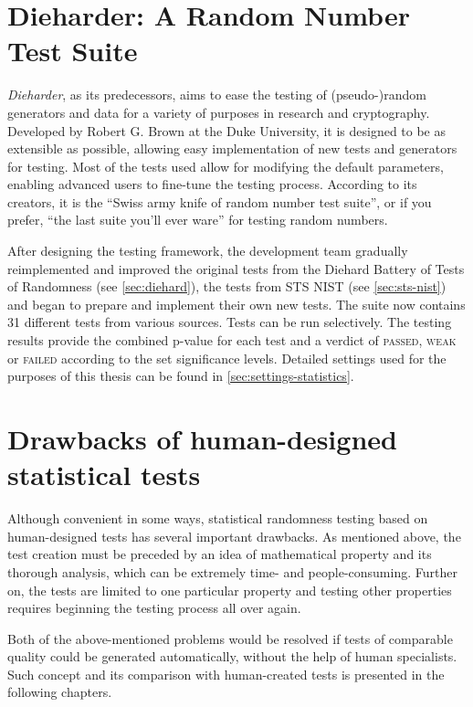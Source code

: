 \documentclass[12pt,twoside]{fithesis2}		%
\renewcommand{\_}{\leavevmode \kern0.0em\vbox{\hrule width0.4em}}
\begin{document}
\section{Dieharder: A Random Number Test Suite}
\label{sec:dieharder}

\textit{Dieharder}, as its predecessors, aims to ease the testing of (pseudo-)random generators 
and data for a variety of purposes in research 
and cryptography. Developed by Robert G. Brown at the Duke University, it is designed to be as extensible as possible, 
allowing easy implementation of new tests and generators for testing. Most of the tests used allow for 
modifying the default parameters, enabling advanced users to fine-tune the testing process.
According to its creators, it is the ``Swiss army knife of random number test suite'', 
or if you prefer, ``the last suite you'll ever ware'' for testing random numbers. \parencite{dieharder}

After designing the testing framework, the development team gradually reimplemented and improved the original tests from 
the Diehard Battery of Tests of Randomness (see \autoref{sec:diehard}), 
the tests from STS NIST (see \autoref{sec:sts-nist}) and began to prepare and implement their own new tests.
The suite now contains 31 different tests from various sources. Tests can be run selectively.
The testing results provide the combined p-value for each test and a verdict of \textsc{passed}, \textsc{weak} or \textsc{failed}
according to the set significance levels.
Detailed settings used for the purposes of this thesis can be found in \autoref{sec:settings-statistics}.

\section{Drawbacks of human-designed statistical tests}
\label{sec:limits-stat-testing}

Although convenient in some ways, statistical randomness testing based on human-designed tests has several important drawbacks.
As mentioned above, the test creation must be preceded by an idea of mathematical property and its thorough analysis, 
which can be extremely time- and people-consuming. Further on, the tests are limited to one particular property and
testing other properties requires beginning the testing process all over again.

Both of the above-mentioned problems would be resolved if tests of comparable quality could be generated automatically, without 
the help of human specialists. Such concept and its comparison with human-created tests is presented in the following chapters.
\end{document}
